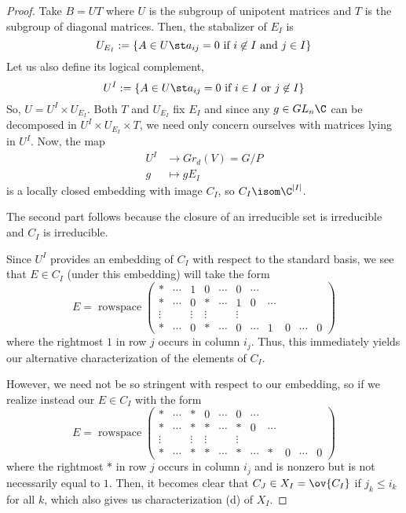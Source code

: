 \documentclass[11pt,leqno,oneside]{amsbook}
\numberwithin{thm}{section}
\newcommand{\Gr}{Gr}
\begin{document}
\begin{proof}
  Take \(B = UT\) where \(U\) is the subgroup of unipotent matrices
  and \(T\) is the subgroup of diagonal matrices. Then, the stabalizer
  of \(E_I\) is \[
    U_{E_I} := \{A \in U \st a_{ij} = 0 \text{ if }i \not \in I \text{
    and }j \in I\}
\]
Let us also define its logical complement, \[
  U^I := \{A \in U \st a_{ij} = 0 \text{ if }i \in I \text{ or }j \not
  \in I\}
\]
So, \(U = U^I \times U_{E_I}\). Both
\(T\) and \(U_{E_I}\) fix 
\(E_I\) and since any \(g \in GL_n \C\) can be decomposed in \(U^I
\times U_{E_I} \times T\), we need only concern ourselves with
matrices lying in \(U^I\). Now, the map
\begin{align*}
  U^I & \to \Gr_d(V) = G/P\\
  g & \mapsto gE_I
\end{align*}
is a locally closed embedding with image \(C_I\), so \(C_I \isom
\C^{|I|}\). 

The second part follows because the closure of an irreducible set is
irreducible and \(C_I\) is irreducible.

Since \(U^I\) provides an embedding of \(C_I\) with respect to the
standard basis, we see that \(E \in C_I\) (under this embedding) will
take the form \[ 
  E = \operatorname{rowspace} \left(
    \begin{array}{ccccccccccc}
      *&\cdots&1&0&\cdots&0&\cdots&&&&\\
      *&\cdots&0&*&\cdots&1&0&\cdots&&&\\
      \vdots&&\vdots&\vdots&&\vdots&&&&&\\
      *&\cdots&0&*&\cdots&0&\cdots&1&0&\cdots&0
    \end{array}
\right)
\]
where the rightmost \(1\) in row \(j\) occurs in column \(i_j\). Thus,
this immediately yields our alternative characterization of the
elements of \(C_I\). 

However, we need not be so stringent with respect to our embedding, so
if we realize instead our \(E \in C_I\) with the form \[ 
  E = \operatorname{rowspace} \left(
    \begin{array}{ccccccccccc}
      *&\cdots&*&0&\cdots&0&\cdots&&&&\\
      *&\cdots&*&*&\cdots&*&0&\cdots&&&\\
      \vdots&&\vdots&\vdots&&\vdots&&&&&\\
      *&\cdots&*&*&\cdots&*&\cdots&*&0&\cdots&0
    \end{array}
\right)
\]
where the rightmost \(*\) in row \(j\) occurs in column \(i_j\) and is
nonzero but is not necessarily equal to \(1\). Then, it becomes clear
that \(C_J \in X_I = \ov{C_I}\) if \(j_k \leq i_k\) for all \(k\),
which also gives us characterization (d) of \(X_I\).
\end{proof}
\end{document}

